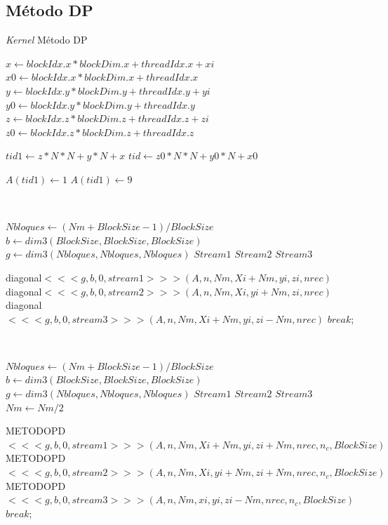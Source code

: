 \documentclass[10pt, conference, compsocconf, onecolumn]{IEEEtran}
\begin{document}
\subsection{M\'etodo DP}
\label{ssec_Metodo_PD}

\begin{algorithm}[H]
	\centering
	\caption{\textit{Kernel} M\'etodo DP}
	\label{metodo_PD}
	\begin{algorithmic}[1]
		\State $x\gets blockIdx.x*blockDim.x+threadIdx.x+xi$
		\State $x0\gets blockIdx.x*blockDim.x+threadIdx.x$
		\State $y\gets blockIdx.y*blockDim.y+threadIdx.y+yi$
		\State $y0\gets blockIdx.y*blockDim.y+threadIdx.y$
		\State $z\gets blockIdx.z*blockDim.z+threadIdx.z+zi$
		\State $z0\gets blockIdx.z*blockDim.z+threadIdx.z$
		
		\State $tid1\gets z*N*N+y*N+x$
		\State $tid\gets z0*N*N+y0*N+x0$
		
		
		\State $A(tid1)\gets 1 $
		\State $A(tid1)\gets 9 $
		
		\EndIf\
		\EndIf\
		
		\State $Nbloques\gets (Nm+BlockSize-1)/BlockSize$
		\State $b\gets dim3(BlockSize,BlockSize,BlockSize)$
		\State $g\gets dim3(Nbloques,Nbloques,Nbloques)$
		\State $Stream1$
		\State $Stream2$
		\State $Stream3$
		
		\State diagonal$<<<g,b,0,stream1>>>(A,n,Nm,Xi+Nm,yi,zi,nrec)$
		\State diagonal$<<<g,b,0,stream2>>>(A,n,Nm,Xi,yi+Nm,zi,nrec)$
		\State diagonal$<<<g,b,0,stream3>>>(A,n,Nm,Xi+Nm,yi,zi-Nm,nrec)$ 
		\State $break$;
		
		\EndIf\
		
		
		\State $Nbloques\gets (Nm+BlockSize-1)/BlockSize$
		\State $b\gets dim3(BlockSize,BlockSize,BlockSize)$
		\State $g\gets dim3(Nbloques,Nbloques,Nbloques)$
		\State $Stream1$
		\State $Stream2$
		\State $Stream3$
		\State $Nm\gets Nm/2$
		
		\State METODOPD$<<<g,b,0,stream1>>>(A,n,Nm,Xi+Nm,yi,zi+Nm,nrec,n_{c},BlockSize)$
		\State METODOPD$<<<g,b,0,stream2>>>(A,n,Nm,Xi,yi+Nm,zi+Nm,nrec,n_{c},BlockSize)$
		\State METODOPD$<<<g,b,0,stream3>>>(A,n,Nm,xi,yi,zi-Nm,nrec,n_{c},BlockSize)$ 
		\State $break$;
		
		\EndIf\
		
		
		
		\EndFunction
	\end{algorithmic}
\end{algorithm}
\end{document}
